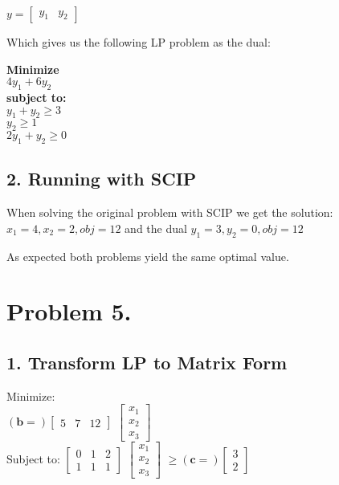 \documentclass[12pt]{report}
\begin{document}
$
y =
\begin{bmatrix}
  y_1 & y_2  
\end{bmatrix}
$ 

Which gives us the following LP problem as the dual:

\textbf{Minimize}\\
  $ 4y_1 + 6y_2 $\\
\textbf{subject to:}\\
  $ y_1 + y_2  \ge 3 $ \\
  $ y_2        \ge 1 $ \\
  $ 2y_1 + y_2 \ge 0 $ 

\subsection*{2. Running with SCIP}

When solving the original problem with SCIP we get the solution:
$ x_1 = 4, x_2 = 2, obj = 12$
and the dual
$ y_1 = 3, y_2 = 0, obj = 12$

As expected both problems yield the same optimal value.



\section*{Problem 5.}
\subsection*{1. Transform LP to Matrix Form}
Minimize: \\
$
(\textbf{b} = )
\begin{bmatrix}
  5 & 7 & 12
\end{bmatrix}
$
$
\begin{bmatrix}
  x_1 \\
  x_2 \\
  x_3
\end{bmatrix}
$\\

Subject to:
$
\begin{bmatrix}
  0 & 1 & 2 \\
  1 & 1 & 1 
\end{bmatrix}
$
$
\begin{bmatrix}
  x_1 \\
  x_2 \\
  x_3
\end{bmatrix}
$
$
\ge
( \textbf{c} = )
\begin{bmatrix}
  3 \\
  2
\end{bmatrix}
$
\end{document}
